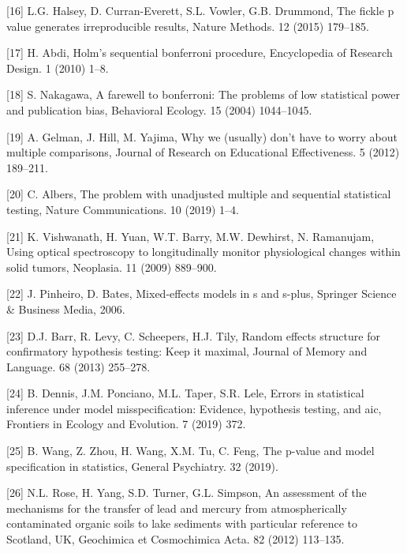 \documentclass[
]{article}
\begin{document}
\leavevmode\hypertarget{ref-halsey2015}{}%
{[}16{]} L.G. Halsey, D. Curran-Everett, S.L. Vowler, G.B. Drummond, The fickle p value generates irreproducible results, Nature Methods. 12 (2015) 179--185.

\leavevmode\hypertarget{ref-abdi2010}{}%
{[}17{]} H. Abdi, Holm's sequential bonferroni procedure, Encyclopedia of Research Design. 1 (2010) 1--8.

\leavevmode\hypertarget{ref-nakagawa2004}{}%
{[}18{]} S. Nakagawa, A farewell to bonferroni: The problems of low statistical power and publication bias, Behavioral Ecology. 15 (2004) 1044--1045.

\leavevmode\hypertarget{ref-gelman2012}{}%
{[}19{]} A. Gelman, J. Hill, M. Yajima, Why we (usually) don't have to worry about multiple comparisons, Journal of Research on Educational Effectiveness. 5 (2012) 189--211.

\leavevmode\hypertarget{ref-albers2019}{}%
{[}20{]} C. Albers, The problem with unadjusted multiple and sequential statistical testing, Nature Communications. 10 (2019) 1--4.

\leavevmode\hypertarget{ref-vishwanath2009}{}%
{[}21{]} K. Vishwanath, H. Yuan, W.T. Barry, M.W. Dewhirst, N. Ramanujam, Using optical spectroscopy to longitudinally monitor physiological changes within solid tumors, Neoplasia. 11 (2009) 889--900.

\leavevmode\hypertarget{ref-pinheiro2006}{}%
{[}22{]} J. Pinheiro, D. Bates, Mixed-effects models in s and s-plus, Springer Science \& Business Media, 2006.

\leavevmode\hypertarget{ref-barr2013}{}%
{[}23{]} D.J. Barr, R. Levy, C. Scheepers, H.J. Tily, Random effects structure for confirmatory hypothesis testing: Keep it maximal, Journal of Memory and Language. 68 (2013) 255--278.

\leavevmode\hypertarget{ref-dennis2019}{}%
{[}24{]} B. Dennis, J.M. Ponciano, M.L. Taper, S.R. Lele, Errors in statistical inference under model misspecification: Evidence, hypothesis testing, and aic, Frontiers in Ecology and Evolution. 7 (2019) 372.

\leavevmode\hypertarget{ref-wang2019}{}%
{[}25{]} B. Wang, Z. Zhou, H. Wang, X.M. Tu, C. Feng, The p-value and model specification in statistics, General Psychiatry. 32 (2019).

\leavevmode\hypertarget{ref-rose2012}{}%
{[}26{]} N.L. Rose, H. Yang, S.D. Turner, G.L. Simpson, An assessment of the mechanisms for the transfer of lead and mercury from atmospherically contaminated organic soils to lake sediments with particular reference to Scotland, UK, Geochimica et Cosmochimica Acta. 82 (2012) 113--135.
\end{document}
